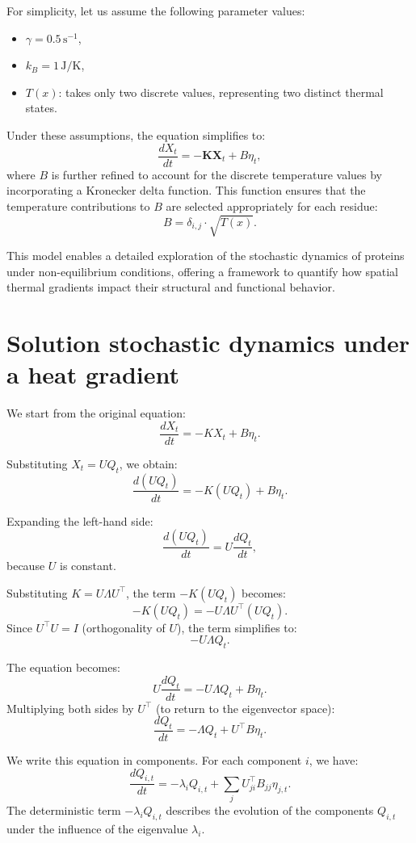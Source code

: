 \documentclass[English, Lau, oneside]{sapthesis}
\begin{document}
For simplicity, let us assume the following parameter values:
\begin{itemize}
    \item \( \gamma = 0.5 \, \text{s}^{-1} \), 
    \item \( k_B = 1 \, \text{J/K} \), 
    \item \( T(x) \): takes only two discrete values, representing two distinct thermal states.
\end{itemize}

Under these assumptions, the equation simplifies to:
\begin{equation}
    \frac{dX_t}{dt} = -\mathbf{K} \mathbf{X}_t + B \eta_t,
\end{equation}
where \( B \) is further refined to account for the discrete temperature values by incorporating a Kronecker delta function. This function ensures that the temperature contributions to \( B \) are selected appropriately for each residue:
\begin{equation}
    B = \delta_{i,j} \cdot \sqrt{T(x)}.
\end{equation}

This model enables a detailed exploration of the stochastic dynamics of proteins under non-equilibrium conditions, offering a framework to quantify how spatial thermal gradients impact their structural and functional behavior.
\newpage
\section{Solution stochastic dynamics under a heat gradient}
We start from the original equation:
\[
\frac{dX_t}{dt} = -K X_t + B \eta_t.
\]

Substituting \(X_t = U Q_t\), we obtain:
\[
\frac{d(U Q_t)}{dt} = -K (U Q_t) + B \eta_t.
\]

Expanding the left-hand side:
\[
\frac{d(U Q_t)}{dt} = U \frac{dQ_t}{dt},
\]
because \(U\) is constant.

Substituting \(K = U \Lambda U^\top\), the term \(-K(U Q_t)\) becomes:
\[
-K(U Q_t) = -U \Lambda U^\top (U Q_t).
\]
Since \(U^\top U = I\) (orthogonality of \(U\)), the term simplifies to:
\[
- U \Lambda Q_t.
\]

The equation becomes:
\[
U \frac{dQ_t}{dt} = -U \Lambda Q_t + B \eta_t.
\]
Multiplying both sides by \(U^\top\) (to return to the eigenvector space):
\[
\frac{dQ_t}{dt} = -\Lambda Q_t + U^\top B \eta_t.
\]

We write this equation in components. For each component \(i\), we have:
\[
\frac{dQ_{i,t}}{dt} = -\lambda_i Q_{i,t} + \sum_j U_{ji}^\top B_{jj} \eta_{j,t}.
\]
The deterministic term \(-\lambda_i Q_{i,t}\) describes the evolution of the components \(Q_{i,t}\) under the influence of the eigenvalue \(\lambda_i\).
\end{document}
